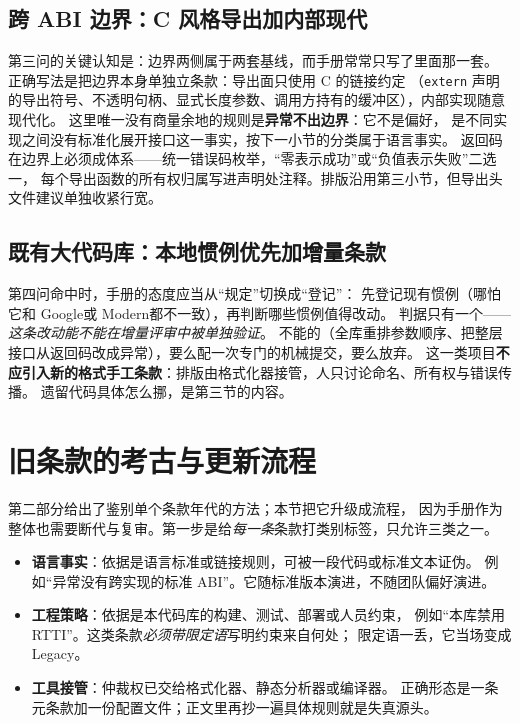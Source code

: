 \documentclass[12pt,a4paper,fontset=fandol]{ctexbook}
\newcommand{\Tp}[1]{\texttt{#1}}
\newcommand{\Lang}[1]{\textsf{#1}}
\newcommand{\DomGo}{\Lang{Google}}
\newcommand{\DomMod}{\Lang{Modern}}
\newcommand{\DomTra}{\Lang{Legacy}}
\begin{document}
\subsection{跨 ABI 边界：\Lang{C} 风格导出加内部现代}
\label{sec:ch14-abi-baseline}

第三问的关键认知是：边界两侧属于两套基线，而手册常常只写了里面那一套。
正确写法是把边界本身单独立条款：导出面只使用 \Lang{C} 的链接约定
（\Tp{extern} 声明的导出符号、不透明句柄、显式长度参数、调用方持有的缓冲区），内部实现随意现代化。
这里唯一没有商量余地的规则是\textbf{异常不出边界}：它不是偏好，
是不同实现之间没有标准化展开接口这一事实，按下一小节的分类属于语言事实。
返回码在边界上必须成体系——统一错误码枚举，``零表示成功''或``负值表示失败''二选一，
每个导出函数的所有权归属写进声明处注释。排版沿用第三小节，但导出头文件建议单独收紧行宽。

\subsection{既有大代码库：本地惯例优先加增量条款}
\label{sec:ch14-legacy-baseline}

第四问命中时，手册的态度应当从``规定''切换成``登记''：
先登记现有惯例（哪怕它和 \DomGo 或 \DomMod 都不一致），再判断哪些惯例值得改动。
判据只有一个——\emph{这条改动能不能在增量评审中被单独验证}。
不能的（全库重排参数顺序、把整层接口从返回码改成异常），要么配一次专门的机械提交，要么放弃。
这一类项目\textbf{不应引入新的格式手工条款}：排版由格式化器接管，人只讨论命名、所有权与错误传播。
遗留代码具体怎么挪，是第三节的内容。

\section{旧条款的考古与更新流程}
\label{sec:ch14-archaeology}

第二部分给出了鉴别单个条款年代的方法；本节把它升级成流程，
因为手册作为整体也需要断代与复审。第一步是给\emph{每一条}条款打类别标签，只允许三类之一。

\begin{itemize}
  \item \textbf{语言事实}：依据是语言标准或链接规则，可被一段代码或标准文本证伪。
        例如``异常没有跨实现的标准 ABI''。它随标准版本演进，不随团队偏好演进。
  \item \textbf{工程策略}：依据是本代码库的构建、测试、部署或人员约束，
        例如``本库禁用 RTTI''。这类条款\emph{必须带限定语}写明约束来自何处；
        限定语一丢，它当场变成 \DomTra。
  \item \textbf{工具接管}：仲裁权已交给格式化器、静态分析器或编译器。
        正确形态是一条元条款加一份配置文件；正文里再抄一遍具体规则就是失真源头。
\end{itemize}
\end{document}

